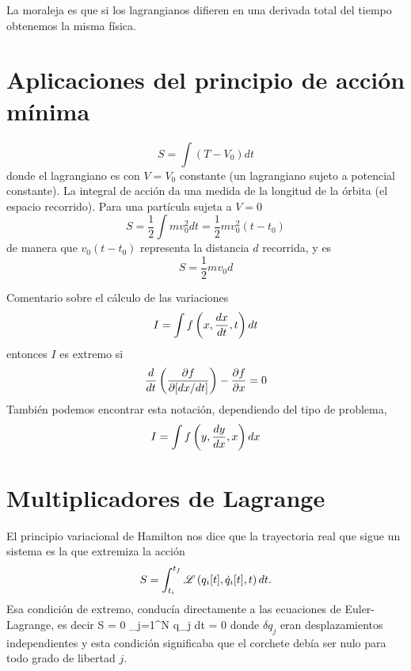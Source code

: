 \documentclass[10pt,oneside]{CBFT_book}
\begin{document}
La moraleja es que si los lagrangianos difieren en una derivada total del tiempo obtenemos la misma
física.

\section{Aplicaciones del principio de acción mínima}

\[
	S = \int (T-V_0) dt
\]
donde el lagrangiano es con $V=V_0$ constante (un lagrangiano sujeto a potencial constante).
La integral de acción da una medida de la longitud de la órbita (el espacio recorrido).
Para una partícula sujeta a $V=0$
\[
	S = \frac{1}{2}\int m v_0^2 dt = \frac{1}{2}mv_0^2(t-t_0)
\]
de manera que $v_0(t-t_0)$ representa la distancia $d$ recorrida, y es 
\[
	S = \frac{1}{2}mv_0 d
\]

Comentario sobre el cálculo de las variaciones
\[
	I = \int f\left(x, \frac{d^{\hspace{-0.05em}} {x}}{d {t}^{\hspace{-0.05em}}}, t\right) dt 
\]
entonces $I$ es extremo si
\[
	\frac{d}{dt} \left( \frac{\partial^{\hspace{-0.05em}} {f}}{\partial {[dx/dt]}^{\hspace{-0.05em}}}\right) - \frac{\partial^{\hspace{-0.05em}} {f}}{\partial {x}^{\hspace{-0.05em}}} = 0
\]
También podemos encontrar esta notación, dependiendo del tipo de problema,
\[
	I = \int f\left(y, \frac{d^{\hspace{-0.05em}} {y}}{d {x}^{\hspace{-0.05em}}}, x\right) dx 
\]


\section{Multiplicadores de Lagrange}

El principio variacional de Hamilton nos dice que la trayectoria real que sigue un sistema es la que 
extremiza la acción
\[
	S = \int_{t_i}^{t_f} \mathscr{L} \left( q_i[t], \dot{q}_i[t], t \right) dt.
\]
Esa condición de extremo, conducía directamente a las ecuaciones de Euler-Lagrange, es decir
\be
	\delta S = 0 \quad \Leftrightarrow \quad \int \sum_{j=1}^{N} 
	\delta q_j \: dt = 0
	\label{accion_nula_ecsel}
\ee
donde $\delta q_j$ eran desplazamientos independientes y esta condición significaba que el corchete debía
ser nulo para todo grado de libertad $j$.
\end{document}
